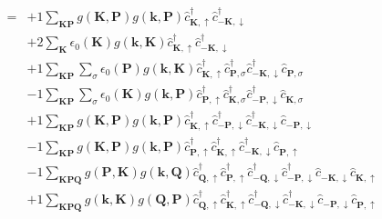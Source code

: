\begin{align*}
	[H, \hat{\Delta}_{k}^\dagger ] = 	&+1 \sum_{ \mathbf{K} \mathbf{P} } g( \mathbf{K}, \mathbf{P} )  g( \mathbf{k}, \mathbf{P} )   \hat{c}_{ \mathbf{K}, \uparrow }^\dagger  \hat{c}_{ -\mathbf{K}, \downarrow }^\dagger   \\
	&+2 \sum_{ \mathbf{K} } \epsilon_0( \mathbf{K} )  g( \mathbf{k}, \mathbf{K} )   \hat{c}_{ \mathbf{K}, \uparrow }^\dagger  \hat{c}_{ -\mathbf{K}, \downarrow }^\dagger   \\
	&+1 \sum_{ \mathbf{K} \mathbf{P} } \sum_{ \sigma } \epsilon_0( \mathbf{P} )  g( \mathbf{k}, \mathbf{K} )   \hat{c}_{ \mathbf{K}, \uparrow }^\dagger  \hat{c}_{ \mathbf{P}, \sigma }^\dagger  \hat{c}_{ -\mathbf{K}, \downarrow }^\dagger  \hat{c}_{ \mathbf{P}, \sigma }^{\phantom{\dagger}}  \\
	&-1 \sum_{ \mathbf{K} \mathbf{P} } \sum_{ \sigma } \epsilon_0( \mathbf{K} )  g( \mathbf{k}, \mathbf{P} )   \hat{c}_{ \mathbf{P}, \uparrow }^\dagger  \hat{c}_{ \mathbf{K}, \sigma }^\dagger  \hat{c}_{ -\mathbf{P}, \downarrow }^\dagger  \hat{c}_{ \mathbf{K}, \sigma }^{\phantom{\dagger}}  \\
	&+1 \sum_{ \mathbf{K} \mathbf{P} } g( \mathbf{K}, \mathbf{P} )  g( \mathbf{k}, \mathbf{P} )   \hat{c}_{ \mathbf{K}, \uparrow }^\dagger  \hat{c}_{ -\mathbf{P}, \downarrow }^\dagger  \hat{c}_{ -\mathbf{K}, \downarrow }^\dagger  \hat{c}_{ -\mathbf{P}, \downarrow }^{\phantom{\dagger}}  \\
	&-1 \sum_{ \mathbf{K} \mathbf{P} } g( \mathbf{K}, \mathbf{P} )  g( \mathbf{k}, \mathbf{P} )   \hat{c}_{ \mathbf{P}, \uparrow }^\dagger  \hat{c}_{ \mathbf{K}, \uparrow }^\dagger  \hat{c}_{ -\mathbf{K}, \downarrow }^\dagger  \hat{c}_{ \mathbf{P}, \uparrow }^{\phantom{\dagger}}  \\
	&-1 \sum_{ \mathbf{K} \mathbf{P} \mathbf{Q} } g( \mathbf{P}, \mathbf{K} )  g( \mathbf{k}, \mathbf{Q} )   \hat{c}_{ \mathbf{Q}, \uparrow }^\dagger  \hat{c}_{ \mathbf{P}, \uparrow }^\dagger  \hat{c}_{ -\mathbf{Q}, \downarrow }^\dagger  \hat{c}_{ -\mathbf{P}, \downarrow }^\dagger  \hat{c}_{ -\mathbf{K}, \downarrow }^{\phantom{\dagger}} \hat{c}_{ \mathbf{K}, \uparrow }^{\phantom{\dagger}}  \\
	&+1 \sum_{ \mathbf{K} \mathbf{P} \mathbf{Q} } g( \mathbf{k}, \mathbf{K} )  g( \mathbf{Q}, \mathbf{P} )   \hat{c}_{ \mathbf{Q}, \uparrow }^\dagger  \hat{c}_{ \mathbf{K}, \uparrow }^\dagger  \hat{c}_{ -\mathbf{Q}, \downarrow }^\dagger  \hat{c}_{ -\mathbf{K}, \downarrow }^\dagger  \hat{c}_{ -\mathbf{P}, \downarrow }^{\phantom{\dagger}} \hat{c}_{ \mathbf{P}, \uparrow }^{\phantom{\dagger}} 
\end{align*}

